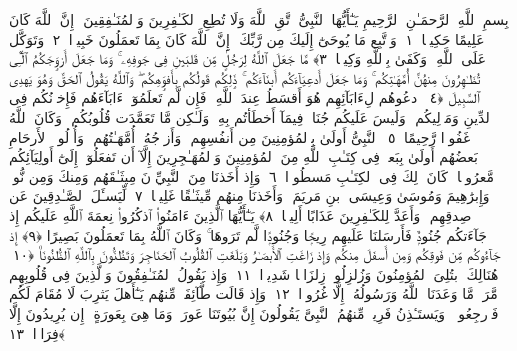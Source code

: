 
  
    
  
    
    

\nopagebreak
  بِسمِ ٱللَّهِ ٱلرَّحمَـٰنِ ٱلرَّحِيمِ
  يَـٰٓأَيُّهَا ٱلنَّبِىُّ ٱتَّقِ ٱللَّهَ وَلَا تُطِعِ ٱلكَـٰفِرِينَ وَٱلمُنَـٰفِقِينَ ۗ إِنَّ ٱللَّهَ كَانَ عَلِيمًا حَكِيمًۭا ﴿١﴾
 وَٱتَّبِع مَا يُوحَىٰٓ إِلَيكَ مِن رَّبِّكَ ۚ إِنَّ ٱللَّهَ كَانَ بِمَا تَعمَلُونَ خَبِيرًۭا ﴿٢﴾
 وَتَوَكَّل عَلَى ٱللَّهِ ۚ وَكَفَىٰ بِٱللَّهِ وَكِيلًۭا ﴿٣﴾
 مَّا جَعَلَ ٱللَّهُ لِرَجُلٍۢ مِّن قَلبَينِ فِى جَوفِهِۦ ۚ وَمَا جَعَلَ أَزوَٟجَكُمُ ٱلَّٰٓـِٔى تُظَـٰهِرُونَ مِنهُنَّ أُمَّهَـٰتِكُم ۚ وَمَا جَعَلَ أَدعِيَآءَكُم أَبنَآءَكُم ۚ ذَٟلِكُم قَولُكُم بِأَفوَٟهِكُم ۖ وَٱللَّهُ يَقُولُ ٱلحَقَّ وَهُوَ يَهدِى ٱلسَّبِيلَ ﴿٤﴾
 ٱدعُوهُم لِءَابَآئِهِم هُوَ أَقسَطُ عِندَ ٱللَّهِ ۚ فَإِن لَّم تَعلَمُوٓا۟ ءَابَآءَهُم فَإِخوَٟنُكُم فِى ٱلدِّينِ وَمَوَٟلِيكُم ۚ وَلَيسَ عَلَيكُم جُنَاحٌۭ فِيمَآ أَخطَأتُم بِهِۦ وَلَـٰكِن مَّا تَعَمَّدَت قُلُوبُكُم ۚ وَكَانَ ٱللَّهُ غَفُورًۭا رَّحِيمًا ﴿٥﴾
 ٱلنَّبِىُّ أَولَىٰ بِٱلمُؤمِنِينَ مِن أَنفُسِهِم ۖ وَأَزوَٟجُهُۥٓ أُمَّهَـٰتُهُم ۗ وَأُو۟لُوا۟ ٱلأَرحَامِ بَعضُهُم أَولَىٰ بِبَعضٍۢ فِى كِتَـٰبِ ٱللَّهِ مِنَ ٱلمُؤمِنِينَ وَٱلمُهَـٰجِرِينَ إِلَّآ أَن تَفعَلُوٓا۟ إِلَىٰٓ أَولِيَآئِكُم مَّعرُوفًۭا ۚ كَانَ ذَٟلِكَ فِى ٱلكِتَـٰبِ مَسطُورًۭا ﴿٦﴾
 وَإِذ أَخَذنَا مِنَ ٱلنَّبِيِّۦنَ مِيثَـٰقَهُم وَمِنكَ وَمِن نُّوحٍۢ وَإِبرَٰهِيمَ وَمُوسَىٰ وَعِيسَى ٱبنِ مَريَمَ ۖ وَأَخَذنَا مِنهُم مِّيثَـٰقًا غَلِيظًۭا ﴿٧﴾
 لِّيَسـَٔلَ ٱلصَّـٰدِقِينَ عَن صِدقِهِم ۚ وَأَعَدَّ لِلكَـٰفِرِينَ عَذَابًا أَلِيمًۭا ﴿٨﴾
 يَـٰٓأَيُّهَا ٱلَّذِينَ ءَامَنُوا۟ ٱذكُرُوا۟ نِعمَةَ ٱللَّهِ عَلَيكُم إِذ جَآءَتكُم جُنُودٌۭ فَأَرسَلنَا عَلَيهِم رِيحًۭا وَجُنُودًۭا لَّم تَرَوهَا ۚ وَكَانَ ٱللَّهُ بِمَا تَعمَلُونَ بَصِيرًا ﴿٩﴾
 إِذ جَآءُوكُم مِّن فَوقِكُم وَمِن أَسفَلَ مِنكُم وَإِذ زَاغَتِ ٱلأَبصَـٰرُ وَبَلَغَتِ ٱلقُلُوبُ ٱلحَنَاجِرَ وَتَظُنُّونَ بِٱللَّهِ ٱلظُّنُونَا۠ ﴿١٠﴾
 هُنَالِكَ ٱبتُلِىَ ٱلمُؤمِنُونَ وَزُلزِلُوا۟ زِلزَالًۭا شَدِيدًۭا ﴿١١﴾
 وَإِذ يَقُولُ ٱلمُنَـٰفِقُونَ وَٱلَّذِينَ فِى قُلُوبِهِم مَّرَضٌۭ مَّا وَعَدَنَا ٱللَّهُ وَرَسُولُهُۥٓ إِلَّا غُرُورًۭا ﴿١٢﴾
 وَإِذ قَالَت طَّآئِفَةٌۭ مِّنهُم يَـٰٓأَهلَ يَثرِبَ لَا مُقَامَ لَكُم فَٱرجِعُوا۟ ۚ وَيَستَـٔذِنُ فَرِيقٌۭ مِّنهُمُ ٱلنَّبِىَّ يَقُولُونَ إِنَّ بُيُوتَنَا عَورَةٌۭ وَمَا هِىَ بِعَورَةٍ ۖ إِن يُرِيدُونَ إِلَّا فِرَارًۭا ﴿١٣﴾
